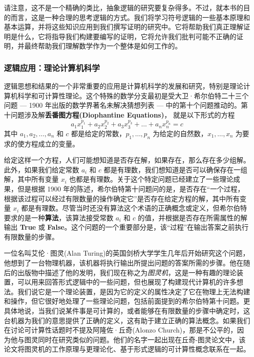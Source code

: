 请注意，这不是一个精确的类比，抽象逻辑的研究要复杂得多。不过，就本书的目的而言，这是一种合理的思考逻辑的方式。我们将学习符号逻辑的一些基本原理和基本运算，并将这些知识应用到我们撰写证明的研究中。它将帮助我们真正理解证明是什么，它将指导我们构建要编写的证明，它将允许我们批判可能不正确的证明，并最终帮助我们理解数学作为一个整体是如何工作的。

\subsubsection*{逻辑应用：理论计算机科学}

逻辑思想和结果的一个非常重要的应用是计算机科学的发展和研究，特别是理论计算机科学和可计算性理论。这个特殊的数学分支最初是受大卫·希尔伯特二十三个问题 --- 1900 年出版的数学界著名未解决猜想列表 --- 中的第十个问题推动的。第十问题涉及解\textbf{丢番图方程(Diophantine Equations)}， 就是以下形式的方程
\[a_1x_1^{p_1}+a_2x_2^{p_2}+a_3x_3^{p_3}+\dots+a_nx_n^{p_n} = c\]
其中 $a_1, a_2, \dots, a_n$ 和 $c$ 都是给定的常数，$p_1, \dots, p_n$ 为给定的自然数，$x_1, \dots, x_n$ 为要求的使方程成立的变量。

给定这样一个方程，人们可能想知道是否存在解，如果存在，那么存在多少组解。 此外，如果我们给定常数 $a_i$ 和 $c$ 都是有理数，我们想知道是否可以确保存在一组解，其中所有变量 $x_i$ 也都是有理数。关于这个特定问题已经建立了一些理论成果，但是根据 1900 年的陈述，希尔伯特第十问题问的是，是否存在``一个过程，根据该过程可以经过有限数量的操作确定它''是否存在给定方程的解，其中所有变量 $x_i$ 都是有理数。尽管当时还没有算法这个术语的正确概念或定义，但希尔伯特要求的是一种\textbf{算法}，该算法接受常数 $a_i$ 和 $c$ 的值，并根据是否存在所需属性的解输出 \textbf{True} 或 \textbf{False}。这个问题的一个重要部分是，该``过程''在输出答案之前执行有限数量的步骤。

一位名叫艾伦·图灵(Alan Turing)的英国剑桥大学学生几年后开始研究这个问题，他想到了一台物理机器，该机器将执行输出所提出问题的答案所需的步骤。他在随后的出版物中描述了他的发明，我们现在称之为\emph{图灵机}，这是一种有趣的理论装置，可以用来回答形式逻辑中的一些问题，但也展现了构建现代计算机的许多想法。我们说它是一个理论装置，是因为它的定义的属性决定了它在物理上无法构建和操作，但它很好地处理了一些理论问题，包括前面提到的希尔伯特第十问题。更具体地说，当我们说某件事是可计算的，或者能够在有限数量的步骤中确定时，这台机器为我们的意思提供了正确的定义，这有助于建立正确的算法概念。如果我们在讨论可计算性话题时不提及阿隆佐·丘奇(Alonzo Church)，那是不公平的，因为他与图灵同时在研究类似的问题。他们的名字一起出现在丘奇-图灵论文中，该论文将图灵机的工作原理与更理论化、基于形式逻辑的可计算性概念联系在一起。

